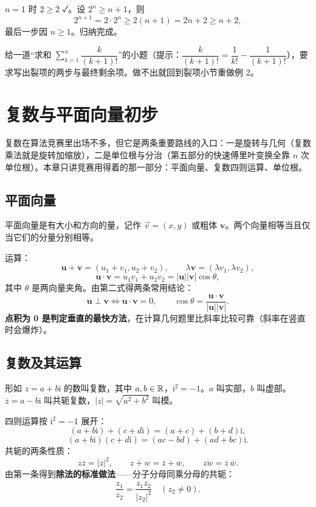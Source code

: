 \sol $n=1$ 时 $2\ge2$ ✓。设 $2^n\ge n+1$，则
\[
2^{n+1}=2\cdot2^n\ge2(n+1)=2n+2\ge n+2,
\]
最后一步因 $n\ge1$。归纳完成。

\begin{teach}[数列章的离堂检查]
给一道“求和 $\sum_{k=1}^{n}\dfrac{k}{(k+1)!}$”的小题（提示：$\dfrac{k}{(k+1)!}=\dfrac1{k!}-\dfrac1{(k+1)!}$），要求写出裂项的两步与最终剩余项。做不出就回到裂项小节重做例 2。
\end{teach}

\chapter{复数与平面向量初步}
\begin{chapterintro}[章节导读]
复数在算法竞赛里出场不多，但它是两条重要路线的入口：一是旋转与几何（复数乘法就是旋转加缩放），二是单位根与分治（第五部分的快速傅里叶变换全靠 $n$ 次单位根）。本章只讲竞赛用得着的那一部分：平面向量、复数四则运算、单位根。
\end{chapterintro}

\section{平面向量}
\begin{definition}[平面向量]
平面向量是有大小和方向的量，记作 $\vec v=(x,y)$ 或粗体 $\mathbf v$。两个向量相等当且仅当它们的分量分别相等。
\end{definition}
运算：
\[
\mathbf u+\mathbf v=(u_1+v_1,u_2+v_2),\qquad
\lambda\mathbf v=(\lambda v_1,\lambda v_2),
\]
\[
\mathbf u\cdot\mathbf v=u_1v_1+u_2v_2=|\mathbf u||\mathbf v|\cos\theta,
\]
其中 $\theta$ 是两向量夹角。由第二式得两条常用结论：
\[
\mathbf u\perp\mathbf v\iff \mathbf u\cdot\mathbf v=0,\qquad
\cos\theta=\frac{\mathbf u\cdot\mathbf v}{|\mathbf u||\mathbf v|}.
\]
\textbf{点积为 0 是判定垂直的最快方法}，在计算几何题里比斜率比较可靠（斜率在竖直时会爆炸）。

\section{复数及其运算}
\begin{definition}[复数]
形如 $z=a+b\mathrm i$ 的数叫复数，其中 $a,b\in\mathbb R$，$\mathrm i^2=-1$。$a$ 叫实部，$b$ 叫虚部。$\overline z=a-b\mathrm i$ 叫共轭复数，$|z|=\sqrt{a^2+b^2}$ 叫模。
\end{definition}
四则运算按 $\mathrm i^2=-1$ 展开：
\[
(a+b\mathrm i)+(c+d\mathrm i)=(a+c)+(b+d)\mathrm i,
\]
\[
(a+b\mathrm i)(c+d\mathrm i)=(ac-bd)+(ad+bc)\mathrm i.
\]
共轭的两条性质：
\[
z\overline z=|z|^2,\qquad \overline{z+w}=\overline z+\overline w,\qquad \overline{zw}=\overline z\,\overline w.
\]
由第一条得到\textbf{除法的标准做法}——分子分母同乘分母的共轭：
\[
\frac{z_1}{z_2}=\frac{z_1\overline{z_2}}{|z_2|^2}\quad(z_2\ne0).
\]

